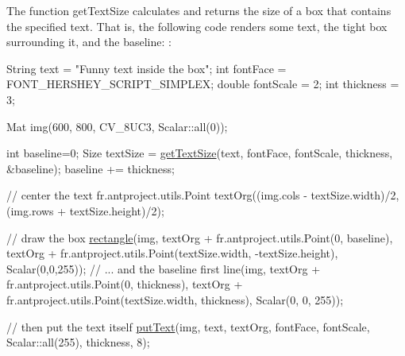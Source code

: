 The function get\+Text\+Size calculates and returns the size of a box that contains the specified text. That is, the following code renders some text, the tight box surrounding it, and the baseline\+: \+: 
\begin{DoxyPre}
\begin{DoxyCode}
String text = \textcolor{stringliteral}{"Funny text inside the box"};
\textcolor{keywordtype}{int} fontFace = FONT\_HERSHEY\_SCRIPT\_SIMPLEX;
\textcolor{keywordtype}{double} fontScale = 2;
\textcolor{keywordtype}{int} thickness = 3;

Mat img(600, 800, CV\_8UC3, Scalar::all(0));

\textcolor{keywordtype}{int} baseline=0;
Size textSize = \hyperlink{group__imgproc__draw_ga089ad50b89bd5274c691876b4ec4a99e}{getTextSize}(text, fontFace,
                            fontScale, thickness, &baseline);
baseline += thickness;

\textcolor{comment}{// center the text}
fr.antproject.utils.Point textOrg((img.cols - textSize.width)/2,
              (img.rows + textSize.height)/2);

\textcolor{comment}{// draw the box}
\hyperlink{group__imgproc__draw_ga011e780e69d07eab5e5e6ac46d4d8dde}{rectangle}(img, textOrg + fr.antproject.utils.Point(0, baseline),
          textOrg + fr.antproject.utils.Point(textSize.width, -textSize.height),
          Scalar(0,0,255));
\textcolor{comment}{// ... and the baseline first}
line(img, textOrg + fr.antproject.utils.Point(0, thickness),
     textOrg + fr.antproject.utils.Point(textSize.width, thickness),
     Scalar(0, 0, 255));

\textcolor{comment}{// then put the text itself}
\hyperlink{group__imgproc__draw_ga18902c6aaf4382fce2c9c0097906f49c}{putText}(img, text, textOrg, fontFace, fontScale,
        Scalar::all(255), thickness, 8);
\end{DoxyCode}
 \end{DoxyPre}
 



